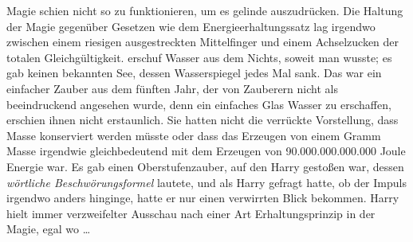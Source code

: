 Magie schien nicht so zu funktionieren, um es gelinde auszudrücken. Die Haltung der Magie gegenüber Gesetzen wie dem Energieerhaltungssatz lag irgendwo zwischen einem riesigen ausgestreckten Mittelfinger und einem Achselzucken der totalen Gleichgültigkeit.  erschuf Wasser aus dem Nichts, soweit man wusste; es gab keinen bekannten See, dessen Wasserspiegel jedes Mal sank. Das war ein einfacher Zauber aus dem fünften Jahr, der von Zauberern nicht als beeindruckend angesehen wurde, denn ein einfaches Glas Wasser zu erschaffen, erschien ihnen nicht erstaunlich. Sie hatten nicht die verrückte Vorstellung, dass Masse konserviert werden müsste oder dass das Erzeugen von einem Gramm Masse irgendwie gleichbedeutend mit dem Erzeugen von 90.000.000.000.000 Joule Energie war. Es gab einen Oberstufenzauber, auf den Harry gestoßen war, dessen \emph{wörtliche Beschwörungsformel}  lautete, und als Harry gefragt hatte, ob der Impuls irgendwo anders hinginge, hatte er nur einen verwirrten Blick bekommen. Harry hielt immer verzweifelter Ausschau nach einer Art Erhaltungsprinzip in der Magie, egal wo …

